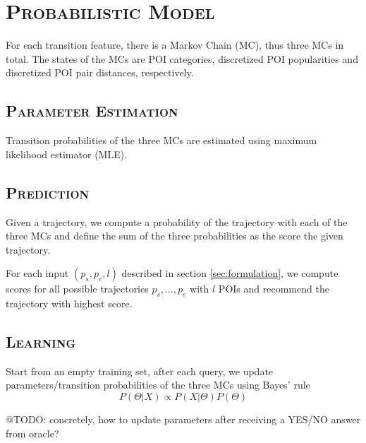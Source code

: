 \documentclass[11pt, a4paper]{article}
\begin{document}
\section{\textsc{Probabilistic Model}}
For each transition feature, there is a Markov Chain (MC), thus three MCs in total.
The states of the MCs are POI categories, discretized POI popularities and discretized POI pair distances, respectively.

\subsection{\textsc{Parameter Estimation}}
Transition probabilities of the three MCs are estimated using maximum likelihood estimator (MLE).

\subsection{\textsc{Prediction}}
Given a trajectory, we compute a probability of the trajectory with each of the three MCs and 
define the sum of the three probabilities as the score the given trajectory.

For each input $(p_s, p_e, l)$ described in section \ref{sec:formulation}, 
we compute scores for all possible trajectories $p_s, \dots, p_e$ with $l$ POIs and
recommend the trajectory with highest score.

\subsection{\textsc{Learning}}
Start from an empty training set, after each query, 
we update parameters/transition probabilities of the three MCs using Bayes' rule
\begin{equation*}
P(\Theta \vert X) \propto P(X \vert \Theta) P(\Theta)
\end{equation*}

@TODO: concretely, how to update parameters after receiving a YES/NO answer from oracle?
\end{document}
